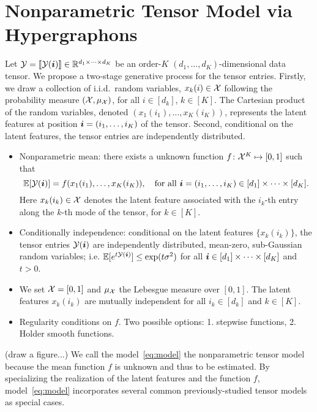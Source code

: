 \documentclass{article}
\begin{document}
\section{Nonparametric Tensor Model via Hypergraphons}
Let $\mathcal{Y}=\llbracket \mathcal{Y}(\bm{i}) \rrbracket\in\mathbb{R}^{d_1\times \cdots \times d_K}$ be an order-$K$ $(d_1,\ldots,d_K)$-dimensional data tensor. We propose a two-stage generative process for the tensor entries. Firstly, we draw a collection of i.i.d.\ random variables, $x_k(i) \in \mathcal{X}$ following the probability measure $(\mathcal{X},\mu_{\mathcal{X}})$, for all $i\in[d_k]$, $k\in[K]$. The Cartesian product of the random variables, denoted $(x_1(i_1),\ldots,x_K(i_K))$, represents the latent features at position $\bm{i}=(i_1,\dots,i_K)$ of the tensor. Second, conditional on the latent features, the tensor entries are independently distributed.
\begin{itemize}[label=\textbullet, leftmargin=*]
\item Nonparametric mean: there exists a unknown function $f\colon \mathcal{X}^K\mapsto [0,1]$ such that
\begin{equation}\label{eq:model}
\mathbb{E}[\tY(\mi)] =f(x_1(i_1),\ldots,x_K(i_K)),\quad \text{for all}\ \mi=(i_1,\ldots,i_K)\in[d_1]\times \cdots \times [d_K].
\end{equation}
Here $x_k(i_k)\in\mathcal{X}$ denotes the latent feature associated with the $i_k$-th entry along the $k$-th mode of the tensor, for $k\in[K]$. 
\item Conditionally independence: conditional on the latent features $\{x_k(i_k)\}$, the tensor entries $\mathcal{Y}(\bm{i})$ are independently distributed, mean-zero, sub-Gaussian random variables; i.e. $\mathbb{E}[e^{t\mathcal{Y}(\bm{i})}]\leq \exp(t\sigma^2)$ for all $\bm{i}\in[d_1]\times \cdots \times[d_K]$ and $t>0$.
\item We set $\mathcal{X}=[0,1]$ and $\mu_{\mathcal{X}}$ the Lebesgue measure over $[0,1]$. The latent features $x_k(i_k)$ are mutually independent for all $i_k\in[d_k]$ and $k\in[K]$.
\item Regularity conditions on $f$. Two possible options: 1. stepwise functions, 2. Holder smooth functions.
\end{itemize}

(draw a figure...) We call the model~\eqref{eq:model} the nonparametric tensor model because the mean function $f$ is unknown and thus to be estimated. By specializing the realization of the latent features and the function $f$, model~\eqref{eq:model} incorporates several common previously-studied tensor models as special cases. 
\end{document}
